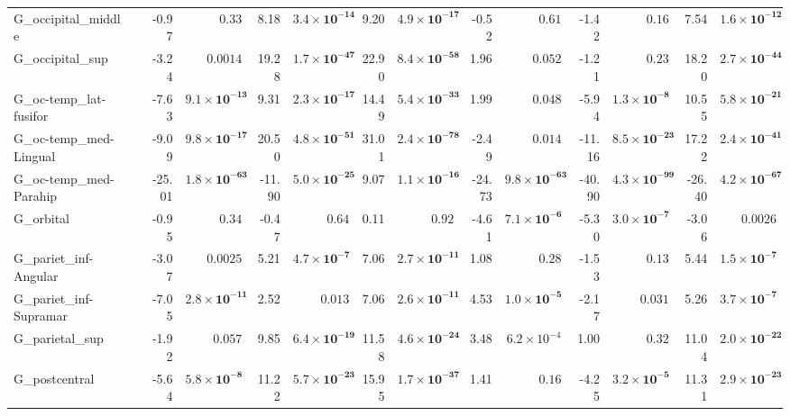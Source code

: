 {\begin{longtable}{llrrrrrrrrrrrr}
G\_occipital\_middle &  & -0.97 & $0.33$ & 8.18 & $\mathbf{3.4{\times}10^{-14}}$ & 9.20 & $\mathbf{4.9{\times}10^{-17}}$ & -0.52 & $0.61$ & -1.42 & $0.16$ & 7.54 & $\mathbf{1.6{\times}10^{-12}}$ \\
G\_occipital\_sup &  & -3.24 & $0.0014$ & 19.28 & $\mathbf{1.7{\times}10^{-47}}$ & 22.90 & $\mathbf{8.4{\times}10^{-58}}$ & 1.96 & $0.052$ & -1.21 & $0.23$ & 18.20 & $\mathbf{2.7{\times}10^{-44}}$ \\
G\_oc-temp\_lat-fusifor &  & -7.63 & $\mathbf{9.1{\times}10^{-13}}$ & 9.31 & $\mathbf{2.3{\times}10^{-17}}$ & 14.49 & $\mathbf{5.4{\times}10^{-33}}$ & 1.99 & $0.048$ & -5.94 & $\mathbf{1.3{\times}10^{-8}}$ & 10.55 & $\mathbf{5.8{\times}10^{-21}}$ \\
G\_oc-temp\_med-Lingual &  & -9.09 & $\mathbf{9.8{\times}10^{-17}}$ & 20.50 & $\mathbf{4.8{\times}10^{-51}}$ & 31.01 & $\mathbf{2.4{\times}10^{-78}}$ & -2.49 & $0.014$ & -11.16 & $\mathbf{8.5{\times}10^{-23}}$ & 17.22 & $\mathbf{2.4{\times}10^{-41}}$ \\
G\_oc-temp\_med-Parahip &  & -25.01 & $\mathbf{1.8{\times}10^{-63}}$ & -11.90 & $\mathbf{5.0{\times}10^{-25}}$ & 9.07 & $\mathbf{1.1{\times}10^{-16}}$ & -24.73 & $\mathbf{9.8{\times}10^{-63}}$ & -40.90 & $\mathbf{4.3{\times}10^{-99}}$ & -26.40 & $\mathbf{4.2{\times}10^{-67}}$ \\
G\_orbital &  & -0.95 & $0.34$ & -0.47 & $0.64$ & 0.11 & $0.92$ & -4.61 & $\mathbf{7.1{\times}10^{-6}}$ & -5.30 & $\mathbf{3.0{\times}10^{-7}}$ & -3.06 & $0.0026$ \\
G\_pariet\_inf-Angular &  & -3.07 & $0.0025$ & 5.21 & $\mathbf{4.7{\times}10^{-7}}$ & 7.06 & $\mathbf{2.7{\times}10^{-11}}$ & 1.08 & $0.28$ & -1.53 & $0.13$ & 5.44 & $\mathbf{1.5{\times}10^{-7}}$ \\
G\_pariet\_inf-Supramar &  & -7.05 & $\mathbf{2.8{\times}10^{-11}}$ & 2.52 & $0.013$ & 7.06 & $\mathbf{2.6{\times}10^{-11}}$ & 4.53 & $\mathbf{1.0{\times}10^{-5}}$ & -2.17 & $0.031$ & 5.26 & $\mathbf{3.7{\times}10^{-7}}$ \\
G\_parietal\_sup &  & -1.92 & $0.057$ & 9.85 & $\mathbf{6.4{\times}10^{-19}}$ & 11.58 & $\mathbf{4.6{\times}10^{-24}}$ & 3.48 & $6.2{\times}10^{-4}$ & 1.00 & $0.32$ & 11.04 & $\mathbf{2.0{\times}10^{-22}}$ \\
G\_postcentral &  & -5.64 & $\mathbf{5.8{\times}10^{-8}}$ & 11.22 & $\mathbf{5.7{\times}10^{-23}}$ & 15.95 & $\mathbf{1.7{\times}10^{-37}}$ & 1.41 & $0.16$ & -4.25 & $\mathbf{3.2{\times}10^{-5}}$ & 11.31 & $\mathbf{2.9{\times}10^{-23}}$ \\

\end{longtable}}
